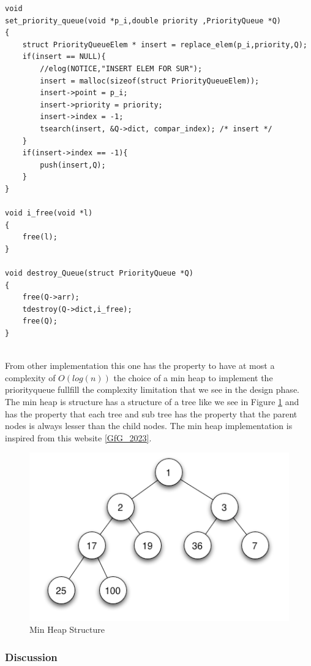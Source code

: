 \documentclass[twoside,12pt, a4paper]{report}
\begin{document}
\begin{lstlisting}
void
set_priority_queue(void *p_i,double priority ,PriorityQueue *Q)
{
	struct PriorityQueueElem * insert = replace_elem(p_i,priority,Q);
	if(insert == NULL){
		//elog(NOTICE,"INSERT ELEM FOR SUR");
		insert = malloc(sizeof(struct PriorityQueueElem));
		insert->point = p_i;
		insert->priority = priority;
		insert->index = -1;
		tsearch(insert, &Q->dict, compar_index); /* insert */
	}
	if(insert->index == -1){
		push(insert,Q);
	}
}

void i_free(void *l)
{
	free(l);
}

void destroy_Queue(struct PriorityQueue *Q)
{
	free(Q->arr);
	tdestroy(Q->dict,i_free);
	free(Q);
}
	
\end{lstlisting}

From other implementation this one has the property to have at most a complexity of $O(log(n))$ the choice of a min heap to implement the priorityqueue fullfill the complexity limitation that we see in the design phase. The min heap is structure has a structure of a tree like we see in Figure \ref{fig:min_heap} and has the property that each tree and sub tree has the property that the parent nodes is always lesser than the child nodes. The min heap implementation is inspired from this website \ref{GfG_2023}.



\begin{figure}[!h]
	\centering
	\includegraphics[width=1\linewidth]{figures/tree.png}
	\caption{Min Heap Structure}
	\label{fig:min_heap}
\end{figure}


\subsubsection{Discussion}
\end{document}
